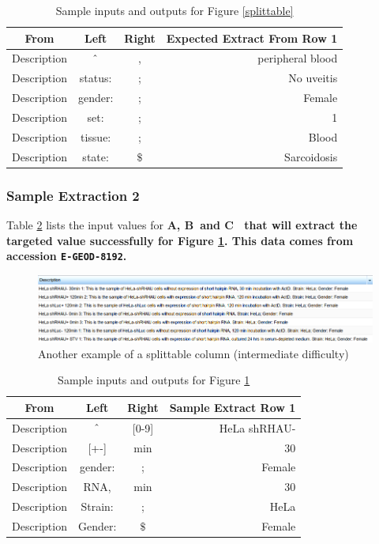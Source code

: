 \documentclass[a4paper]{article}
\begin{document}
\begin{table}[h]
\begin{center}
\begin{tabular}{| c c c r |}
\hline
From & Left & Right & Expected Extract From Row 1\\
\hline
Description &  $\mathbin{\char`\^}$ & , & peripheral blood \\
\hline
Description & status: & ; & No uveitis \\
\hline
Description & gender: & ; & Female \\
\hline
Description & set: & ; & 1 \\
\hline
Description & tissue: & ; & Blood \\
\hline
Description & state: & $\$$ & Sarcoidosis\\
\hline
\end{tabular}
\end{center}
\caption{Sample inputs and outputs for Figure \ref{splittable}}
\label{extractexamples}
\end{table}

\subsubsection{Sample Extraction 2}
Table \ref{anotherExample} lists the input values for \bf{A}, \bf{B}\rm ~and \bf{C}\rm~ that will extract the targeted value successfully for Figure \ref{splittable2}. This data comes from accession \texttt{E-GEOD-8192}.

\begin{figure}[h]
\caption{Another example of a splittable column (intermediate difficulty)}
\centering
\label{splittable2}
\includegraphics[width=17cm]{images/moreextract}
\end{figure}

\begin{table}[h]
\begin{center}
\begin{tabular}{| c c c r |}
\hline
From & Left & Right & Sample Extract Row 1\\
\hline
Description &   $\mathbin{\char`\^}$ & [0-9] & HeLa shRHAU-\\
\hline
Description & [+-] & min & 30 \\
\hline
Description & gender: & ; & Female \\
\hline
Description & RNA, & min & 30 \\
\hline
Description & Strain: & ; & HeLa \\
\hline
Description & Gender: & $\$$ & Female\\
\hline
\end{tabular}
\end{center}
\caption{Sample inputs and outputs for Figure \ref{splittable2}}
\label{anotherExample}
\end{table}
\end{document}
